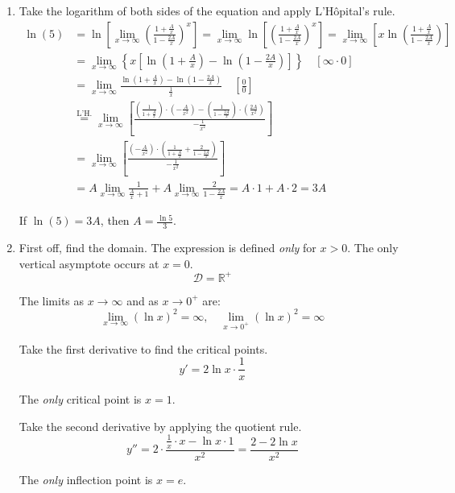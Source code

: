 \documentclass[a4paper, 12pt]{article}
\begin{document}
\begin{enumerate}[leftmargin=*,label=\textbf{\arabic*.}]
\newpage
\item Take the logarithm of both sides of the equation and apply L'Hôpital's rule.
\begin{align*}
\ln(5)&=\ln\left[\lim_{x\to\infty}\left(\frac{\displaystyle1+\frac Ax}{\displaystyle1-\frac {2A}x}\right)^{x}\right]=\lim_{x\to\infty}\ln\left[\left(\frac{\displaystyle1+\frac Ax}{\displaystyle1-\frac {2A}x}\right)^{x}\right]=\lim_{x\to\infty}\left[x\ln\left(\frac{\displaystyle1+\frac Ax}{\displaystyle1-\frac {2A}x}\right)\right]\\[1em]&=\lim_{x\to\infty}\left\{x\left[\ln\left(1+\frac Ax\right)-\ln\left(1-\frac {2A}x\right)\right]\right\}\quad\left[\infty\cdot0\right]\\[1em]&=\lim_{x\to\infty}\frac{\displaystyle\ln\left(1+\frac Ax\right)-\ln\left(1-\frac {2A}x\right)}{\displaystyle\frac1x}\quad\left[\frac00\right]\\[1em]&\overset{\text{L'H.}}{=}\lim_{x\to\infty}\left[\frac{\displaystyle\left(\frac1{1+\frac Ax}\right)\cdot\left(-\frac{A}{x^2}\right)-\left(\frac1{1-\frac{2A}x}\right)\cdot\left(\frac{2A}{x^2}\right)}{\displaystyle -\frac1{x^2}}\right]\\[1em]&=\lim_{x\to\infty}\left[\frac{\displaystyle\left(-\frac{A}{x^2}\right)\cdot\left(\frac1{1+\frac{A}x}+\frac{2}{1-\frac{2A}x}\right)}{\displaystyle-\frac{1}{x^2}}\right]\\[1em]&=A\lim_{x\to\infty}\frac1{\frac Ax + 1}+A\lim_{x\to\infty}\frac2{1-\frac{2A}x} = A \cdot 1 + A \cdot 2 = 3A
\end{align*}

If $\ln(5) = 3A$, then $\boxed{A =\frac{\ln5}3}$.

\item First off, find the domain. The expression is defined \textit{only} for $x>0$. The only vertical asymptote occurs at $x=0$.
\[\mathcal{D} = \mathbb{R}^+\]

The limits as $x\to\infty$ and as $x\to0^+$ are:
\[\lim_{x\to \infty}(\ln x)^2=\infty,\quad \lim_{x\to0^+}(\ln x)^2=\infty \]

Take the first derivative to find the critical points.
\[y'=2\ln x\cdot\frac1x\]

The \textit{only} critical point is $x=1$.

Take the second derivative by applying the quotient rule.
\[y''=2\cdot\frac{\frac1x \cdot x-\ln x \cdot 1}{x^2}=\frac{2-2\ln x}{x^2}\]

The \textit{only} inflection point is $x= e$.


\end{enumerate}
\end{document}
